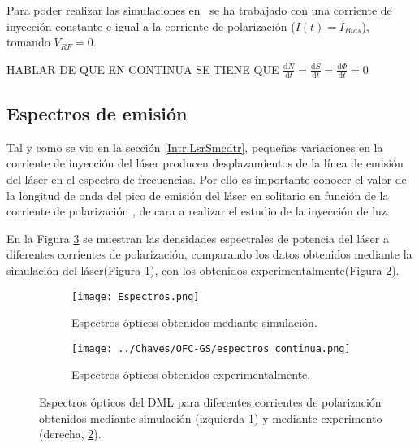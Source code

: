 
		Para poder realizar las simulaciones en \cw\ se ha trabajado con una corriente de inyección constante e igual a la corriente de polarización ($I(t) = I_{Bias}$), tomando $V_{RF} = 0$.

		HABLAR DE QUE EN CONTINUA SE TIENE QUE $\frac{\mathrm{d} N}{\mathrm{d} t} = \frac{\mathrm{d} S}{\mathrm{d} t} = \frac{\mathrm{d} \Phi}{\mathrm{d} t} = 0$

		\subsection{Espectros de emisión}

			Tal y como se vio en la secci\'on \ref{Intr:LsrSmcdtr}, pequeñas variaciones en la corriente de inyección del láser producen desplazamientos de la línea de emisión del láser en el espectro de frecuencias. Por ello es importante conocer el valor de la longitud de onda del pico de emisión del láser en solitario en función de la corriente de polarización \ibias, de cara a realizar el estudio de la inyección de luz.

			En la Figura \ref{Img:spectrosCW} se muestran las densidades espectrales de potencia del l\'aser a diferentes corrientes de polarización, comparando los datos obtenidos mediante la simulaci\'on del l\'aser(Figura \ref{Img:spectrosCW:sim}), con los obtenidos experimentalmente(Figura \ref{Img:spectrosCW:exp}).
		
				\begin{figure}[H]
					\centering
					\begin{subfigure}{0.45\textwidth}
						\centering
						\texttt{[image: Espectros.png]}
						\caption{\label{Img:spectrosCW:sim}Espectros ópticos obtenidos mediante simulación.}
					\end{subfigure}
					\begin{subfigure}{0.45\textwidth}
						\centering
						\texttt{[image: ../Chaves/OFC-GS/espectros\_continua.png]}
						\caption{\label{Img:spectrosCW:exp}Espectros ópticos obtenidos experimentalmente.}	
					\end{subfigure}
					\caption{\label{Img:spectrosCW}Espectros ópticos del DML para diferentes corrientes de polarización \ibias obtenidos mediante simulación (izquierda \ref{Img:spectrosCW:sim}) y mediante experimento (derecha, \ref{Img:spectrosCW:exp}).}
				\end{figure}

